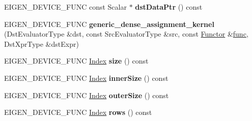 \begin{DoxyCompactItemize}
E\+I\+G\+E\+N\+\_\+\+D\+E\+V\+I\+C\+E\+\_\+\+F\+U\+NC const Scalar $\ast$ {\bfseries dst\+Data\+Ptr} () const
\item 
\mbox{\label{class_eigen_1_1internal_1_1generic__dense__assignment__kernel_a78626a9a6997a4e2402b2a4c2f841aa7}} 
E\+I\+G\+E\+N\+\_\+\+D\+E\+V\+I\+C\+E\+\_\+\+F\+U\+NC {\bfseries generic\+\_\+dense\+\_\+assignment\+\_\+kernel} (Dst\+Evaluator\+Type \&dst, const Src\+Evaluator\+Type \&src, const \hyperlink{struct_functor}{Functor} \&\hyperlink{structfunc}{func}, Dst\+Xpr\+Type \&dst\+Expr)
\item 
\mbox{\label{class_eigen_1_1internal_1_1generic__dense__assignment__kernel_a82a9cc7d42ec2577722ed15a829b77bd}} 
E\+I\+G\+E\+N\+\_\+\+D\+E\+V\+I\+C\+E\+\_\+\+F\+U\+NC \hyperlink{namespace_eigen_a62e77e0933482dafde8fe197d9a2cfde}{Index} {\bfseries size} () const
\item 
\mbox{\label{class_eigen_1_1internal_1_1generic__dense__assignment__kernel_aca5b2865e530f046e184124034fc079d}} 
E\+I\+G\+E\+N\+\_\+\+D\+E\+V\+I\+C\+E\+\_\+\+F\+U\+NC \hyperlink{namespace_eigen_a62e77e0933482dafde8fe197d9a2cfde}{Index} {\bfseries inner\+Size} () const
\item 
\mbox{\label{class_eigen_1_1internal_1_1generic__dense__assignment__kernel_a5e3f6c72327428a8579436ad0eacaa56}} 
E\+I\+G\+E\+N\+\_\+\+D\+E\+V\+I\+C\+E\+\_\+\+F\+U\+NC \hyperlink{namespace_eigen_a62e77e0933482dafde8fe197d9a2cfde}{Index} {\bfseries outer\+Size} () const
\item 
\mbox{\label{class_eigen_1_1internal_1_1generic__dense__assignment__kernel_af2b7c2682462c20bc08a6e30f9215e4f}} 
E\+I\+G\+E\+N\+\_\+\+D\+E\+V\+I\+C\+E\+\_\+\+F\+U\+NC \hyperlink{namespace_eigen_a62e77e0933482dafde8fe197d9a2cfde}{Index} {\bfseries rows} () const
\item 
\mbox{\label{class_eigen_1_1internal_1_1generic__dense__assignment__kernel_ab407bdaab83a8c681a46a2ff497dbb7c}} 

\end{DoxyCompactItemize}
